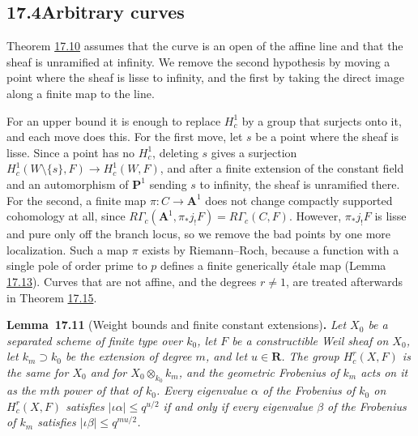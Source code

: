 \documentclass[11pt]{article}
\newenvironment{bpstatement}[2]{\par\addvspace{0.6\baselineskip}\noindent\textbf{#1}#2\textbf{.}\enspace\ignorespaces}
  {\par\addvspace{0.4\baselineskip}}
\newenvironment{bpstatementit}[2]{\begin{bpstatement}{#1}{#2}\itshape\ignorespaces}{\end{bpstatement}}
\begin{document}
\subsection*{\texorpdfstring{17.4\quad Arbitrary curves}{17.4 Arbitrary curves}}
\label{bp255}%
\label{bp256}%
Theorem \hyperref[bp252]{17.10} assumes that the curve is an open of the affine line and that the sheaf is unramified at infinity. We remove the second hypothesis by moving a point where the sheaf is lisse to infinity, and the first by taking the direct image along a finite map to the line.

For an upper bound it is enough to replace \(H^1_c\) by a group that surjects onto it, and each move does this. For the first move, let \(s\) be a point where the sheaf is lisse. Since a point has no \(H^1_c\), deleting \(s\) gives a surjection \(H^1_c(W\setminus\{s\},F)\to H^1_c(W,F)\), and after a finite extension of the constant field and an automorphism of \(\mathbf P^1\) sending \(s\) to infinity, the sheaf is unramified there. For the second, a finite map \(\pi:C\to\mathbf A^1\) does not change compactly supported cohomology at all, since \(R\Gamma_c(\mathbf A^1,\pi_*j_!F)=R\Gamma_c(C,F)\). However, \(\pi_*j_!F\) is lisse and pure only off the branch locus, so we remove the bad points by one more localization. Such a map \(\pi\) exists by Riemann–Roch, because a function with a single pole of order prime to \(p\) defines a finite generically étale map (Lemma \hyperref[bp263]{17.13}). Curves that are not affine, and the degrees \(r\ne1\), are treated afterwards in Theorem \hyperref[bp269]{17.15}.

\label{bp257}%
\begin{bpstatementit}{Lemma~17.11}{ (Weight bounds and finite constant extensions)}
Let \(X_0\) be a separated scheme of finite type over \(k_0\), let \(F\) be a constructible Weil sheaf on \(X_0\), let \(k_m\supset k_0\) be the extension of degree \(m\), and let \(u\in\mathbf R\). The group \(H^r_c(X,F)\) is the same for \(X_0\) and for \(X_0\otimes_{k_0}k_m\), and the geometric Frobenius of \(k_m\) acts on it as the \(m\)th power of that of \(k_0\). Every eigenvalue \(\alpha\) of the Frobenius of \(k_0\) on \(H^r_c(X,F)\) satisfies \(|\iota\alpha|\le q^{u/2}\) if and only if every eigenvalue \(\beta\) of the Frobenius of \(k_m\) satisfies \(|\iota\beta|\le q^{mu/2}\).
\end{bpstatementit}
\end{document}
